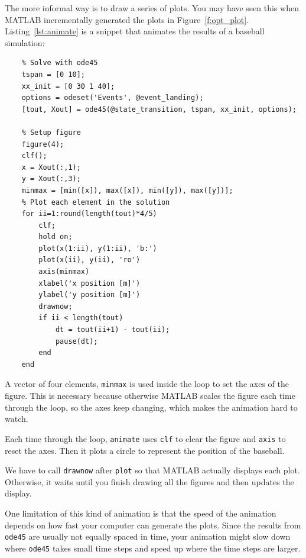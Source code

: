 \documentclass[../../book.tex]{subfiles}
\begin{document}

The more informal way is to draw a series of plots.  You may have seen this when MATLAB incrementally generated the plots in Figure~\ref{f:opt_plot}.  Listing~\ref{lst:animate} is a snippet that animates the results of a baseball simulation:

\begin{lstlisting}[caption={A snippet that animates the results of a baseball simulation}, label={lst:animate}]
    % Animate
    % Solve with ode45
    tspan = [0 10];
    xx_init = [0 30 1 40];
    options = odeset('Events', @event_landing);
    [tout, Xout] = ode45(@state_transition, tspan, xx_init, options);
    
    % Setup figure
    figure(4);
    clf();
    x = Xout(:,1);
    y = Xout(:,3);
    minmax = [min([x]), max([x]), min([y]), max([y])];
    % Plot each element in the solution
    for ii=1:round(length(tout)*4/5)
        clf; 
        hold on;
        plot(x(1:ii), y(1:ii), 'b:')
        plot(x(ii), y(ii), 'ro')
        axis(minmax)
        xlabel('x position [m]')
        ylabel('y position [m]')
        drawnow;
        if ii < length(tout)
            dt = tout(ii+1) - tout(ii);
            pause(dt);
        end
    end
\end{lstlisting}

A vector of four elements, \lstinline{minmax} is used inside the loop to set the axes of the figure.
This is necessary because otherwise MATLAB scales the figure each time through the loop,
so the axes keep changing, which makes the animation hard to watch.


Each time through the loop, \lstinline{animate} uses \lstinline{clf}
to clear the figure and \lstinline{axis} to reset the axes.  Then it plots a circle to represent the position of the \mbox{baseball}.


We have to call \lstinline{drawnow} after \lstinline{plot} so
that MATLAB actually displays each plot.  Otherwise, it waits
until you finish drawing all the figures and then updates
the display.

One limitation of this kind of animation is that the speed
of the animation depends on how fast your computer can generate
the plots.  Since the results from \lstinline{ode45} are usually not
equally spaced in time, your animation might slow down where
\lstinline{ode45} takes small time steps and speed up where the time
steps are larger.
\end{document}
